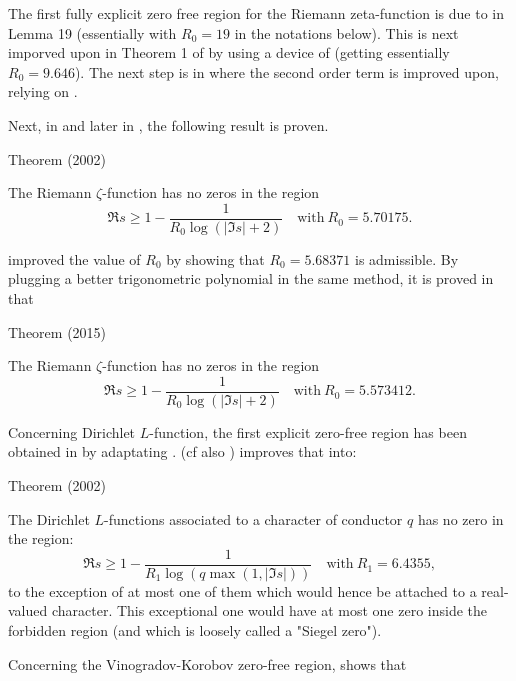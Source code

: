 The first fully explicit zero free region for the Riemann zeta-function is due
to \cite{Rosser*38} in Lemma 19 (essentially
with $R_0=19$ in the notations below). This is next imporved upon in Theorem 1
of \cite{Rosser-Schoenfeld*75}
by using a device of
\cite{Stechkin*70} (getting
essentially $R_0=9.646$).
The next step is in
\cite{Ramare-Rumely*96} 
where the second order term is improved upon, relying on
\cite{Stechkin*89}.

Next, in
\cite{Kadiri*02}
and later in
\cite{Kadiri*05},
the following result is proven.

\begin{thm}{Theorem (2002)}

  The Riemann $\zeta$-function has no zeros in the region
  $$
    \Re s \ge 1- \frac1{R_0 \log (| \Im s|+2)}\quad\text{with}\  R_0=5.70175.
  $$
\end{thm}



\cite{Jang-Kwon*14}
improved the value of $R_0$ by showing that $R_0=5.68371$ is admissible.
By plugging a better trigonometric polynomial in the same method,
it is proved in
\cite{Mossinghoff-Trudgian*15}
that

\begin{thm}{Theorem (2015)}

  The Riemann $\zeta$-function has no zeros in the region
  $$
    \Re s \ge 1- \frac1{R_0 \log (| \Im s|+2)}\quad\text{with}\  R_0=5.573412.
  $$
\end{thm}


Concerning Dirichlet $L$-function, the first explicit zero-free region has been obtained in
\cite{McCurley*84-1} by adaptating
\cite{Rosser-Schoenfeld*75}.
\cite{Kadiri*02} (cf also
\cite{Kadiri*02-2})
improves that into:

\begin{thm}{Theorem (2002)}

  The Dirichlet $L$-functions associated to a character of conductor $q$ has
  no zero in the region:
  $$
    \Re s \ge 1- \frac1{R_1 \log(q \max(1,| \Im s|))}  \quad\text{with}\
    R_1=6.4355, 
  $$
  to the exception of at most one of them which would hence be attached to a
  real-valued character. This exceptional one would have at most one zero
  inside the forbidden region (and which is loosely called a "Siegel zero").
\end{thm}



Concerning the Vinogradov-Korobov zero-free region,
\cite{Ford*01}
shows that

